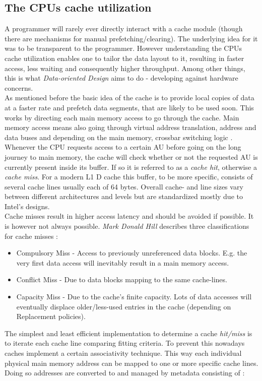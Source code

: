 \subsection{The CPUs cache utilization}\label{cpucu}
A programmer will rarely ever directly interact with a cache module (though there are mechanisms for manual prefetching/clearing). The underlying idea for it was to be transparent to the programmer. However understanding the CPUs cache utilization enables one to tailor the data layout to it, resulting in faster access, less waiting and consequently higher throughput. Among other things, this is what \textit{Data-oriented Design} aims to do - developing against hardware concerns. \\
As mentioned before the basic idea of the cache is to provide local copies of data at a faster rate and prefetch data segments, that are likely to be used soon. This works by directing each main memory access to go through the cache. Main memory access means also going through virtual address translation, address and data buses and depending on the main memory, crossbar switching logic .  
Whenever the CPU requests access to a certain AU before going on the long journey to main memory, the cache will check whether or not the requested AU is currently present inside its buffer. If so it is referred to as a \textit{cache hit}, otherwise a \textit{cache miss}. For a modern L1 D cache this buffer, to be more specific, consists of several cache lines usually each of 64 bytes. Overall cache- and line sizes vary between different architectures and levels but are standardized mostly due to Intel's designs.\\
Cache misses result in higher access latency and should be avoided if possible. It is however not always possible. \textit{Mark Donald Hill} describes three classifications for cache misses :
\begin{itemize}
	\item Compulsory Miss - Access to previously unreferenced data blocks. E.g. the very first data access will inevitably result in a main memory access.
	\item Conflict Miss - Due to data blocks mapping to the same cache-lines.
	\item Capacity Miss - Due to the cache's finite capacity. Lots of data accesses will eventually displace older/less-used entries in the cache (depending on Replacement policies).
\end{itemize}
The simplest and least efficient implementation to determine a cache \textit{hit/miss} is to iterate each cache line comparing fitting criteria. To prevent this nowadays caches implement a certain associativity technique. This way each individual physical main memory address can be mapped to one or more specific cache lines. Doing so addresses are converted to and managed by metadata consisting of :

